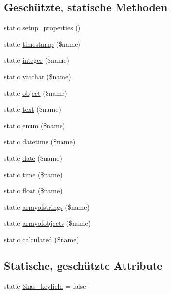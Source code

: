 \subsection*{Geschützte, statische Methoden}
\begin{DoxyCompactItemize}
\item 
static \hyperlink{classSunhill_1_1Objects_1_1oo__object_a54ec84831a079865fbec25b2fa6e5a92}{setup\+\_\+properties} ()
\item 
static \hyperlink{classSunhill_1_1Objects_1_1oo__object_a219e028a30d72cd26b94a9a42428865e}{timestamp} (\$name)
\item 
static \hyperlink{classSunhill_1_1Objects_1_1oo__object_a592ff3a9229becf7aadaf028e0d4a799}{integer} (\$name)
\item 
static \hyperlink{classSunhill_1_1Objects_1_1oo__object_a31e144d542dfaf440b220525ae114826}{varchar} (\$name)
\item 
static \hyperlink{classSunhill_1_1Objects_1_1oo__object_a9d967a42f26fb8cc9171e211b178359c}{object} (\$name)
\item 
static \hyperlink{classSunhill_1_1Objects_1_1oo__object_a391fd39d36234ee389e67831293945b6}{text} (\$name)
\item 
static \hyperlink{classSunhill_1_1Objects_1_1oo__object_a72924b9bd8975350fe5bebd2e4c2a2a2}{enum} (\$name)
\item 
static \hyperlink{classSunhill_1_1Objects_1_1oo__object_a5be3a418c444766331831cbe45ebc824}{datetime} (\$name)
\item 
static \hyperlink{classSunhill_1_1Objects_1_1oo__object_a433bbffcd30eb8a99fce1334940f9120}{date} (\$name)
\item 
static \hyperlink{classSunhill_1_1Objects_1_1oo__object_a321378d344abadd84b2d063cb7f91f0c}{time} (\$name)
\item 
static \hyperlink{classSunhill_1_1Objects_1_1oo__object_a4ad33c7671a6c81308696a7cef0cc534}{float} (\$name)
\item 
static \hyperlink{classSunhill_1_1Objects_1_1oo__object_a8f4eadd501c8218322501754743a1507}{arrayofstrings} (\$name)
\item 
static \hyperlink{classSunhill_1_1Objects_1_1oo__object_ac21dba412c5eab2bc7a9b78a995f8811}{arrayofobjects} (\$name)
\item 
static \hyperlink{classSunhill_1_1Objects_1_1oo__object_af522b3a840a45ac7e9ebd0eac8cbe328}{calculated} (\$name)
\end{DoxyCompactItemize}
\subsection*{Statische, geschützte Attribute}
\begin{DoxyCompactItemize}
\item 
static \hyperlink{classSunhill_1_1Objects_1_1oo__object_ab807b56579a1825bf0a13f3ea4164b0a}{\$has\+\_\+keyfield} = false
\end{DoxyCompactItemize}

